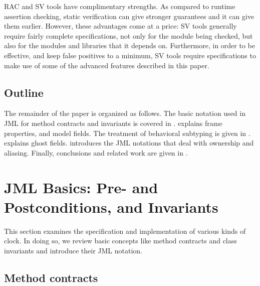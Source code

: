 \documentclass{llncs}
\begin{document}
RAC and SV tools have complimentary strengths.
As compared to runtime assertion checking, static verification can give
stronger guarantees and it can give them earlier.
However, these advantages come at a price:
%
SV tools generally require fairly complete specifications, not only for the
module being checked, but also for the modules and libraries that it depends
on. Furthermore, in order to be effective, and keep false positives to a
minimum, SV tools require specifications to make use of some of the advanced
features described in this paper.

\subsection{Outline}

The remainder of the paper is organized as follows.
The basic notation used in JML for method contracts
and invariants is covered in .
 explains frame properties, and  model fields.
The treatment of behavioral subtyping is given in .
 explains ghost fields.
 introduces the JML notations that deal with
ownership and aliasing.  
Finally, conclusions and related work are given in .

\section{JML Basics: Pre- and Postconditions, and Invariants}
\label{Sec:basics}

%
%
This section examines the specification and implementation of
various kinds of clock.  In doing so, we review basic concepts like
method contracts and class invariants and introduce their JML notation.

\subsection{Method contracts}
\end{document}
